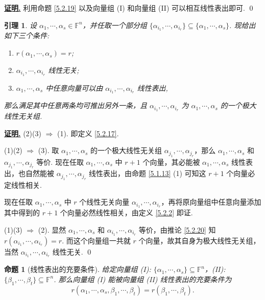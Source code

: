 \documentclass[10pt,openany]{article}
\theoremstyle{thmstyle} %
\theoremstyle{defstyle} %
\newtheorem{lemma}[theorem]{引理}
\theoremstyle{prostyle} %
\newtheorem{proposition}[theorem]{命题}
\theoremstyle{exastyle}
\theoremstyle{remstyle}
\renewenvironment{proof}[1][证明]{\par\underline{\textbf{#1.}} \;\fangsong}{\qed\par}
\newcommand{\F}{\mathbb{F}}
\begin{document}
\begin{proof}
	利用命题 \ref{5.2.19} 以及向量组 (I) 和向量组 (II) 可以相互线性表出即可.
\end{proof}


\begin{lemma} \label{5.2.21}
	设 \( \alpha_1,\cdots,\alpha_s \in \F^n \)，并任取一个部分组 \( \{\alpha_{i_1}, \cdots, \alpha_{i_r}\} \subseteq \{\alpha_1,\cdots,\alpha_s\} \). 现给出如下三个条件:
	\begin{enumerate}[(1)]
		\item \( r(\alpha_1,\cdots,\alpha_s)=r \);
		\item \( \alpha_{i_1}, \cdots, \alpha_{i_r} \) 线性无关;
		\item \( \alpha_1,\cdots,\alpha_s \) 中任意向量可以由 \( \alpha_{i_1}, \cdots, \alpha_{i_r} \) 线性表出,
	\end{enumerate} 
	
	那么满足其中任意两条均可推出另外一条，且 \( \alpha_{i_1}, \cdots, \alpha_{i_r} \) 为 \( \alpha_1,\cdots,\alpha_s \) 的一个极大线性无关组.
\end{lemma}

\begin{proof}
	(2)(3) \( \Rightarrow \) (1). 即定义 \ref{5.2.17}.
	
	(1)(2) \( \Rightarrow \) (3). 取 \( \alpha_1,\cdots,\alpha_s \) 的一个极大线性无关组 \( \alpha_{j_1}, \cdots, \alpha_{j_r} \)，那么 \( \alpha_1,\cdots,\alpha_s \) 和 \( \alpha_{j_1}, \cdots, \alpha_{j_r} \) 等价. 现在任取 \( \alpha_1,\cdots,\alpha_s \) 中 \( r+1 \) 个向量，其必能被 \( \alpha_1,\cdots,\alpha_s \) 线性表出，也自然能被 \( \alpha_{j_1}, \cdots, \alpha_{j_r} \) 线性表出，由命题 \ref{5.1.13} (1) 可知这 \( r+1 \) 个向量必定线性相关.
	
	现在任取 \( \alpha_1,\cdots,\alpha_s \) 中 \( r \) 个线性无关向量 \( \alpha_{i_1}, \cdots, \alpha_{i_r} \)，再将原向量组中任意向量添加其中得到的 \( r+1 \) 个向量必然线性相关，由定义 \ref{5.2.2} 即证.
	
	(1)(3) \( \Rightarrow \) (2). 显然 \( \alpha_1,\cdots,\alpha_s \) 和 \( \alpha_{i_1}, \cdots, \alpha_{i_r} \) 等价，由推论 \ref{5.2.20} 知 \( r(\alpha_{i_1}, \cdots, \alpha_{i_r}) = r \). 而这个向量组一共就 \( r \) 个向量，故其自身为极大线性无关组，当然 \( \alpha_{i_1}, \cdots, \alpha_{i_r} \) 线性无关.
\end{proof}


\begin{proposition}[线性表出的充要条件] \label{5.2.22}
	给定向量组 (I): \( \{\alpha_1,\cdots,\alpha_s\} \subseteq \F^n \)，(II): \( \{\beta_1,\cdots,\beta_t\} \subseteq \F^n \). 那么向量组 (I) 能被向量组 (II) 线性表出的充要条件为
	\[ r(\alpha_1,\cdots,\alpha_s,\beta_1,\cdots,\beta_t)=r(\beta_1,\cdots,\beta_t).\]
\end{proposition}
\end{document}
